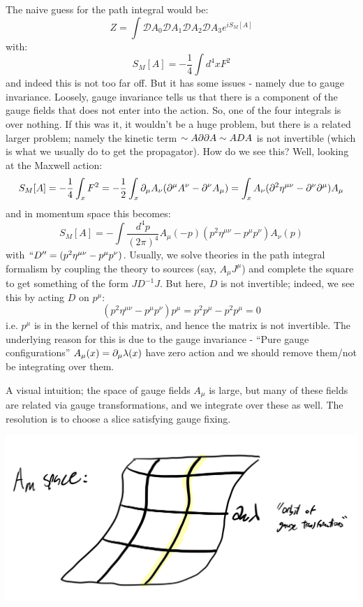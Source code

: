 The naive guess for the path integral would be:
\begin{equation}
    Z = \int \mathcal{D}A_0 \mathcal{D}A_1 \mathcal{D}A_2 \mathcal{D}A_3 e^{iS_M[A]}
\end{equation}
with:
\begin{equation}
    S_M[A] = -\frac{1}{4}\int d^4x F^2
\end{equation}
and indeed this is not too far off. But it has some issues - namely due to gauge invariance. Loosely, gauge invariance tells us that there is a component of the gauge fields that does not enter into the action. So, one of the four integrals is over nothing. If this was it, it wouldn't be a huge problem, but there is a related larger problem; namely the kinetic term $\sim A\partial\partial A \sim AD A$ is not invertible (which is what we usually do to get the propagator). How do we see this? Well, looking at the Maxwell action:
\begin{equation}
    S_M[A] = -\frac{1}{4}\int_x F^2 = -\frac{1}{2}\int_x \partial_\mu A_\nu (\partial^\mu A^\nu - \partial^\nu A_\mu) = \int_x A_\nu (\partial^2 \eta^{\mu\nu} - \partial^\nu \partial^\mu)A_\mu
\end{equation}
and in momentum space this becomes:
\begin{equation}
    S_M[A] = -\int\frac{d^4p}{(2\pi)^4}A_\mu(-p)(p^2\eta^{\mu\nu} - p^\mu p^\nu) A_\nu(p)
\end{equation}
with $``D'' = (p^2\eta^{\mu\nu} - p^\mu p^\nu)$. Usually, we solve theories in the path integral formalism by coupling the theory to sources (say, $A_\mu J^\mu$) and complete the square to get something of the form $JD^{-1}J$. But here, $D$ is not invertible; indeed, we see this by acting $D$ on $p^\mu$:
\begin{equation}
    (p^2\eta^{\mu\nu} - p^\mu p^\nu)p^\mu = p^2p^\mu - p^2 p^\mu = 0
\end{equation}
i.e. $p^\mu$ is in the kernel of this matrix, and hence the matrix is not invertible. The underlying reason for this is due to the gauge invariance - ``Pure gauge configurations'' $A_\mu(x) = \partial_\mu \lambda(x)$ have zero action and we should remove them/not be integrating over them.

A visual intuition; the space of gauge fields $A_\mu$ is large, but many of these fields are related via gauge transformations, and we integrate over these as well. The resolution is to choose a slice satisfying gauge fixing.

\begin{center}
    \includegraphics[scale=0.35]{Lectures/Images/lec8-gaugefields.png}
\end{center}

